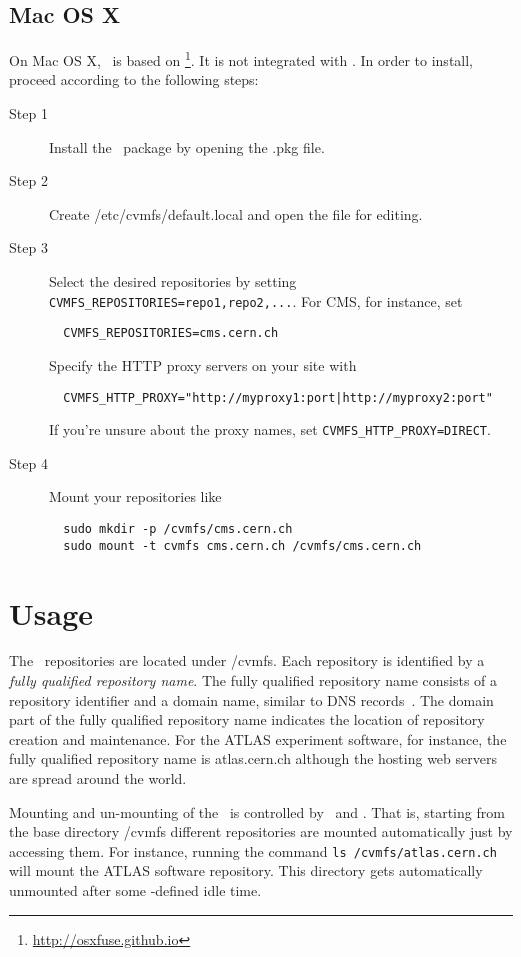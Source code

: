 \subsection{Mac OS X}
On Mac OS X, \cvmfs\ is based on \osxfuse\footnote{\url{http://osxfuse.github.io}}. 
It is not integrated with \autofs.
In order to install, proceed according to the following steps:
\begin{description}
	\item[Step 1] Install the \cvmfs\ package by opening the .pkg file.
	\item[Step 2] Create /etc/cvmfs/default.local and open the file for editing.
	\item[Step 3] Select the desired repositories by setting \texttt{CVMFS\_REPOSITORIES=repo1,repo2,...}.
		For CMS, for instance, set 
\begin{verbatim}
  CVMFS_REPOSITORIES=cms.cern.ch
\end{verbatim}
		Specify the HTTP proxy servers on your site with
\begin{verbatim}
  CVMFS_HTTP_PROXY="http://myproxy1:port|http://myproxy2:port"
\end{verbatim}
	If you're unsure about the proxy names, set \texttt{CVMFS\_HTTP\_PROXY=DIRECT}.
    \item[Step 4] Mount your repositories like
\begin{verbatim} 
  sudo mkdir -p /cvmfs/cms.cern.ch
  sudo mount -t cvmfs cms.cern.ch /cvmfs/cms.cern.ch
\end{verbatim}
\end{description}

\section{Usage}
The \cvmfs\ repositories are located under /cvmfs.
Each repository is identified by a \emph{fully qualified repository name}.
The fully qualified repository name consists of a repository identifier and a domain name, similar to DNS records~\cite{rfc1035}.
The domain part of the fully qualified repository name indicates the location of repository creation and maintenance.
For the ATLAS experiment software, for instance, the fully qualified repository name is atlas.cern.ch although the hosting web servers are spread around the world.

Mounting and un-mounting of the \cvmfs\ is controlled by \autofs\ and .
That is, starting from the base directory /cvmfs different repositories are mounted automatically just by accessing them.
For instance, running the command \texttt{ls /cvmfs/atlas.cern.ch} will mount the ATLAS software repository.
This directory gets automatically unmounted after some -defined idle time.

